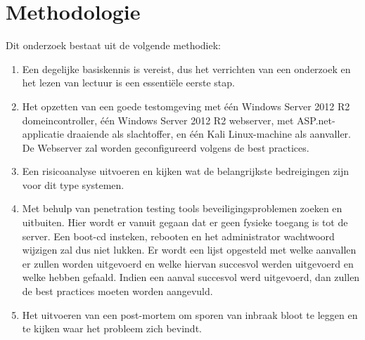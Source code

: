 \documentclass[pdftex,a4paper,12pt]{report}
\begin{document}
\chapter{Methodologie}
\label{ch:methodologie}


Dit onderzoek bestaat uit de volgende methodiek:
\begin{enumerate}
	\item Een degelijke basiskennis is vereist, dus het verrichten van een onderzoek en het lezen van lectuur is een essentiële eerste stap.
	\item Het opzetten van een goede testomgeving met één Windows Server 2012 R2 domeincontroller, één Windows Server 2012 R2 webserver, met ASP.net-applicatie draaiende als slachtoffer, en één Kali Linux-machine als aanvaller. De Webserver zal worden geconfigureerd volgens de best practices.
	\item Een risicoanalyse uitvoeren en kijken wat de belangrijkste bedreigingen zijn voor dit type systemen.
	\item Met behulp van penetration testing tools beveiligingsproblemen zoeken en uitbuiten. Hier wordt er vanuit gegaan dat er geen fysieke toegang is tot de server. Een boot-cd insteken, rebooten en het administrator wachtwoord wijzigen zal dus niet lukken. Er wordt een lijst opgesteld met welke aanvallen er zullen worden uitgevoerd en welke hiervan succesvol werden uitgevoerd en welke hebben gefaald. Indien een aanval succesvol werd uitgevoerd, dan zullen de best practices moeten worden aangevuld.
	\item Het uitvoeren van een post-mortem om sporen van inbraak bloot te leggen en te kijken waar het probleem zich bevindt.
\end{enumerate}
\end{document}

